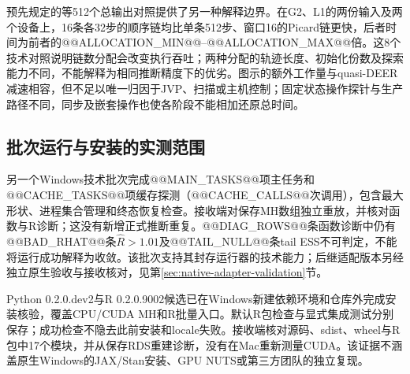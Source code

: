 预先规定的等512个总输出对照提供了另一种解释边界。在G2、L1的两份输入及两个设备上，16条各32步的顺序链均比单条512步、窗口16的Picard链更快，后者时间为前者的@@ALLOCATION_MIN@@--@@ALLOCATION_MAX@@倍。这8个技术对照说明链数分配会改变执行吞吐；两种分配的轨迹长度、初始化份数及探索能力不同，不能解释为相同推断精度下的优劣。图示的额外工作量与quasi-DEER减速相容，但不足以唯一归因于JVP、扫描或主机控制；固定状态操作探针与生产路径不同，同步及嵌套操作也使各阶段不能相加还原总时间。

\subsection{批次运行与安装的实测范围}
另一个Windows技术批次完成@@MAIN_TASKS@@项主任务和@@CACHE_TASKS@@项缓存探测（@@CACHE_CALLS@@次调用），包含最大形状、进程集合管理和终态恢复检查。接收端对保存MH数组独立重放，并核对函数与R诊断；这没有新增正式推断重复。@@DIAG_ROWS@@条函数诊断中仍有@@BAD_RHAT@@条$\hat R>1.01$及@@TAIL_NULL@@条tail ESS不可判定，不能将运行成功解释为收敛。该批次支持其封存运行器的技术能力；后继适配版本另经独立原生验收与接收核对，见第\ref{sec:native-adapter-validation}节。

Python 0.2.0.dev2与R 0.2.0.9002候选已在Windows新建依赖环境和仓库外完成安装核验，覆盖CPU/CUDA MH和R批量入口。默认R包检查与显式集成测试分别保存；成功检查不隐去此前安装和locale失败。接收端核对源码、sdist、wheel与R包中17个模块，并从保存RDS重建诊断，没有在Mac重新测量CUDA。该证据不涵盖原生Windows的JAX/Stan安装、GPU NUTS或第三方团队的独立复现。
